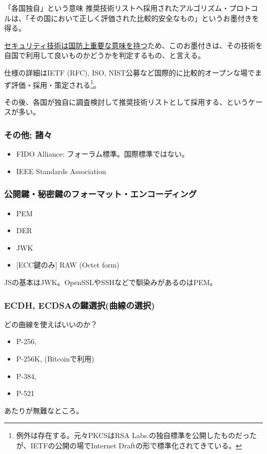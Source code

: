 \documentclass[12pt,dvipdfmx]{beamer}
\begin{document}
\begin{frame}
\small
 
\begin{block}{\small 「各国独自」という意味}
推奨技術リストへ採用されたアルゴリズム・プロトコルは、「その国において正しく評価された比較的安全なもの」というお墨付きを得る。


\underline{セキュリティ技術は国防上重要な意味を持つ}ため、このお墨付きは、その技術を自国で利用して良いものかどうかを判定するもの、と言える。
\end{block}

仕様の詳細はIETF (RFC), ISO, NIST公募など国際的に比較的オープンな場でまず評価・採用・策定される\footnote[frame]{\scriptsize 例外は存在する。元々PKCSはRSA Labs.の独自標準を公開したものだったが、IETFの公開の場でInternet Draftの形で標準化されてきている。}。

\vspace{1ex}

その後、各国が独自に調査検討して推奨技術リストとして採用する、というケースが多い。

\end{frame}

\begin{frame}
\frametitle{その他; 諸々}
\begin{itemize}
 \item FIDO Alliance: フォーラム標準。国際標準ではない。
 \item IEEE Standards Association
\end{itemize}
\end{frame}



\begin{frame}
\frametitle{公開鍵・秘密鍵のフォーマット・エンコーディング}
\begin{itemize}
 \item PEM
 \item DER
 \item JWK
 \item {[ECC鍵のみ]}  RAW (Octet form)
\end{itemize}
JSの基本はJWK。OpenSSLやSSHなどで馴染みがあるのはPEM。
\end{frame}

\begin{frame}
\frametitle{ECDH, ECDSAの鍵選択(曲線の選択)}
どの曲線を使えばいいのか？
\begin{itemize}
 \item P-256,
 \item P-256K, (Bitcoinで利用)
 \item P-384,
 \item P-521
\end{itemize}
あたりが無難なところ。
\end{frame}
\end{document}
